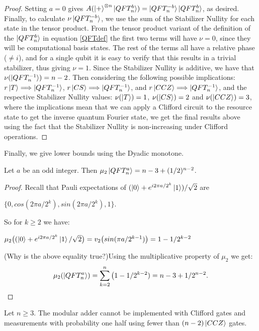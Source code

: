 \documentclass[12pt]{dalthesis}
\begin{document}
\begin{proof}
Setting $a=0$ gives $A(\ket{+}^{\otimes n} \ket{QFT_n^b}) = \ket{QFT_n^{-b}}\ket{QFT_n^b}$, as desired. Finally, to calculate $\nu \ket{QFT_n^{-b}}$, we use the sum of the Stabilizer Nullity for each state in the tensor product. From the tensor product variant of the definition of the $\ket{QFT_n^b}$ in equation \ref{QFTdef} the first two terms will have $\nu = 0$, since they will be computational basis states. The rest of the terms all have a relative phase ($\neq i$), and for a single qubit it is easy to verify that this results in a trivial stabilizer, thus giving $\nu = 1$. Since the Stabilizer Nullity is additive, we have that $\nu(\ket{QFT_n^{-1}}) = n-2$. Then considering the following possible implications: $r\ket{T} \Longrightarrow \ket{QFT_n^{-1}}$, $r\ket{CS} \Longrightarrow \ket{QFT_n^{-1}}$, and $r\ket{CCZ} \Longrightarrow \ket{QFT_n^{-1}}$, and the respective Stabilizer Nullity values: $\nu (\ket{T}) = 1$, $\nu (\ket{CS}) = 2$ and $\nu (\ket{CCZ}) = 3$, where the implications mean that we can apply a Clifford circuit to the resource state to get the inverse quantum Fourier state, we get the final results above using the fact that the Stabilizer Nullity is non-increasing under Clifford operations.
\end{proof}

Finally, we give lower bounds using the Dyadic monotone.

\begin{lemma}
  \label{lem:fourrierstate}
Let $a$ be an odd integer. Then $\mu_2\ket{QFT_n^a} = n-3 +(1/2)^{n-2}$.
\end{lemma}

\begin{proof}
Recall that Pauli expectations of $(\ket{0} + e^{i2\pi a/2^k}\ket{1})/\sqrt{2}$ are
\begin{center}
$\{ 0, cos(2\pi a/2^k), sin(2\pi a/2^k), 1 \}$.
\end{center}
So for $k \geq 2$ we have:
\begin{center}
$\mu_2 \big( (\ket{0} + e^{i2\pi a/2^k} \ket{1}/\sqrt{2} \big) = v_2 \big( sin(\pi a/2^{k-1}) \big) = 1 - 1/2^{k-2}$
\end{center}
(Why is the above equality true?)Using the multiplicative property of $\mu_2$ we get:
\[
\mu_2 (\ket{QFT_n^a}) = \sum\limits_{k=2}^n \big( 1-1/2^{k-2}) = n-3 + 1/2^{n-2}.\qedhere
\]
\end{proof}

\begin{proposition}
Let $n\geq 3$. The modular adder cannot be implemented with Clifford
gates and measurements with probability one half using fewer than
$(n-2) \ket{CCZ}$ gates.
\end{proposition}
\end{document}
